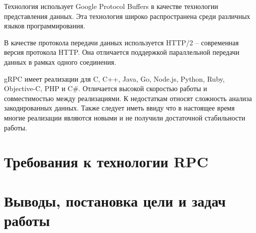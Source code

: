 Технология использует Google Protocol Buffers в качестве технологии
представления данных. Эта технология широко распространена среди
различных языков программирования.

В качестве протокола передачи данных используется HTTP/2 -- современная
версия протокола HTTP. Она отличается поддержкой параллельной передачи
данных в рамках одного соединения.

gRPC имеет реализации для C, C++, Java, Go, Node.js, Python, Ruby, Objective-C,
PHP и C\#. Отличается высокой скоростью работы и совместимостью между
реализациями. К недостаткам относят сложность анализа закодированных данных.
Также следует иметь ввиду что в настоящее время многие реализации являются
новыми и не получили достаточной стабильности работы.

\section{Требования к технологии RPC}

\section{Выводы, постановка цели и задач работы}
